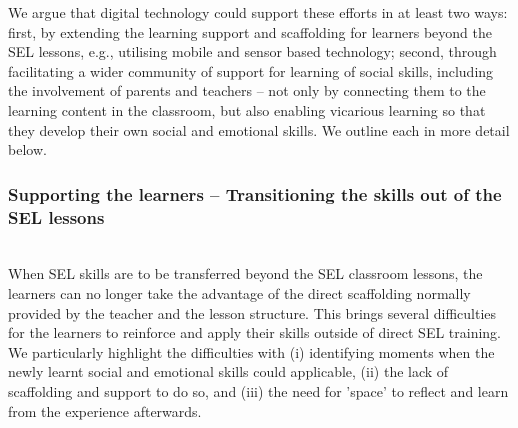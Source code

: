 \documentclass[prodmode,acmtochi]{acmsmall}
\newcommand{\todo}[1]{\textrm{\textrm{\textcolor{LightBlue}{[[#1]]}}}}
\begin{document}
We argue that digital technology could support these efforts in at least two ways: first, by extending the learning support and scaffolding for learners beyond the SEL lessons, e.g., utilising mobile and sensor based technology; second, through facilitating a wider community of support for learning of social skills, including the involvement of parents and teachers -- not only by connecting them to the learning content in the classroom, but also enabling vicarious learning so that they develop their own social and emotional skills. We outline each in more detail below.

\subsubsection{Supporting the learners  -- Transitioning the skills out of the SEL lessons}
\label{sec:Embedding-learners} ~ \\
When SEL skills are to be transferred beyond the SEL classroom lessons, the learners can no longer take the advantage of the direct scaffolding normally provided by the teacher and the lesson structure. This brings several difficulties for the learners to reinforce and apply their skills outside of direct SEL training. We particularly highlight the difficulties with (i) identifying moments when the newly learnt social and emotional skills could applicable, (ii) the lack of scaffolding and support to do so, and (iii) the need for 'space' to reflect and learn from the experience afterwards. 

\end{document}
